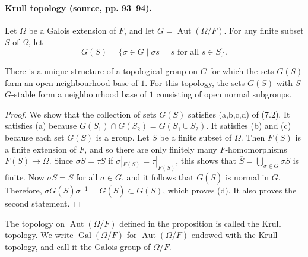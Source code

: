 \paragraph{Krull topology (source, pp. 93--94).}
Let $\Omega$ be a Galois extension of $F$, and let $G=\operatorname{Aut}(\Omega/F)$. For any finite subset $S$ of $\Omega$, let
\[
G(S)=\{\sigma\in G\mid \sigma s=s\text{ for all }s\in S\}.
\]
\begin{proposition}[7.6]
There is a unique structure of a topological group on $G$ for which the sets $G(S)$ form an open neighbourhood base of $1$. For this topology, the sets $G(S)$ with $S$ $G$-stable form a neighbourhood base of $1$ consisting of open normal subgroups.
\end{proposition}
\begin{proof}
We show that the collection of sets $G(S)$ satisfies (a,b,c,d) of (7.2). It satisfies (a) because $G(S_1)\cap G(S_2)=G(S_1\cup S_2)$. It satisfies (b) and (c) because each set $G(S)$ is a group. Let $S$ be a finite subset of $\Omega$. Then $F(S)$ is a finite extension of $F$, and so there are only finitely many $F$-homomorphisms $F(S)\to\Omega$. Since $\sigma S=\tau S$ if $\sigma|_{F(S)}=\tau|_{F(S)}$, this shows that $\overline S=\bigcup_{\sigma\in G}\sigma S$ is finite. Now $\sigma\overline S=\overline S$ for all $\sigma\in G$, and it follows that $G(\overline S)$ is normal in $G$. Therefore, $\sigma G(\overline S)\sigma^{-1}=G(\overline S)\subset G(S)$, which proves (d). It also proves the second statement.
\end{proof}
The topology on $\operatorname{Aut}(\Omega/F)$ defined in the proposition is called the Krull topology. We write $\operatorname{Gal}(\Omega/F)$ for $\operatorname{Aut}(\Omega/F)$ endowed with the Krull topology, and call it the Galois group of $\Omega/F$.

